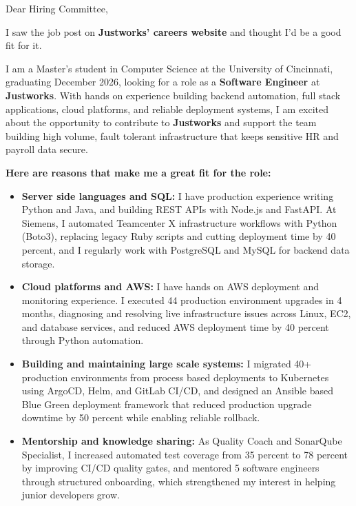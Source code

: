 \documentclass[11pt]{letter}
\date{}
\begin{document}
\begin{letter}{}

\opening{Dear Hiring Committee,}

I saw the job post on \textbf{Justworks' careers website} and thought I'd be a good fit for it.

I am a Master's student in Computer Science at the University of Cincinnati, graduating December 2026, looking for a role as a \textbf{Software Engineer} at \textbf{Justworks}. With hands on experience building backend automation, full stack applications, cloud platforms, and reliable deployment systems, I am excited about the opportunity to contribute to \textbf{Justworks} and support the team building high volume, fault tolerant infrastructure that keeps sensitive HR and payroll data secure.

\textbf{Here are reasons that make me a great fit for the role:}

\begin{itemize}[leftmargin=*, itemsep=0.45em]
    \item \textbf{Server side languages and SQL:} I have production experience writing Python and Java, and building REST APIs with Node.js and FastAPI. At Siemens, I automated Teamcenter X infrastructure workflows with Python (Boto3), replacing legacy Ruby scripts and cutting deployment time by 40 percent, and I regularly work with PostgreSQL and MySQL for backend data storage.

    \item \textbf{Cloud platforms and AWS:} I have hands on AWS deployment and monitoring experience. I executed 44 production environment upgrades in 4 months, diagnosing and resolving live infrastructure issues across Linux, EC2, and database services, and reduced AWS deployment time by 40 percent through Python automation.

    \item \textbf{Building and maintaining large scale systems:} I migrated 40+ production environments from process based deployments to Kubernetes using ArgoCD, Helm, and GitLab CI/CD, and designed an Ansible based Blue Green deployment framework that reduced production upgrade downtime by 50 percent while enabling reliable rollback.

    \item \textbf{Mentorship and knowledge sharing:} As Quality Coach and SonarQube Specialist, I increased automated test coverage from 35 percent to 78 percent by improving CI/CD quality gates, and mentored 5 software engineers through structured onboarding, which strengthened my interest in helping junior developers grow.


\end{itemize}
\end{letter}
\end{document}
